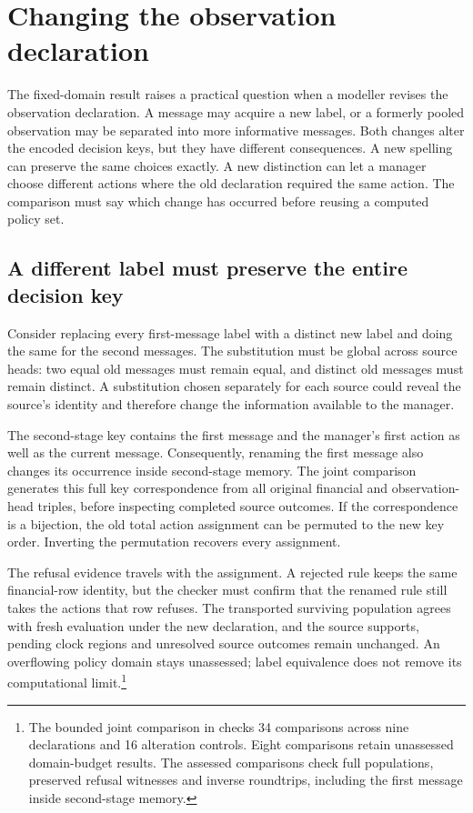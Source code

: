 \section{Changing the observation declaration}
\label{sim:joint-domain-changes}

The fixed-domain result raises a practical question when a modeller revises the observation declaration. A message may acquire a new label, or a formerly pooled observation may be separated into more informative messages. Both changes alter the encoded decision keys, but they have different consequences. A new spelling can preserve the same choices exactly. A new distinction can let a manager choose different actions where the old declaration required the same action. The comparison must say which change has occurred before reusing a computed policy set.

\subsection{A different label must preserve the entire decision key}

Consider replacing every first-message label with a distinct new label and doing the same for the second messages. The substitution must be global across source heads: two equal old messages must remain equal, and distinct old messages must remain distinct. A substitution chosen separately for each source could reveal the source's identity and therefore change the information available to the manager.

The second-stage key contains the first message and the manager's first action as well as the current message. Consequently, renaming the first message also changes its occurrence inside second-stage memory. The joint comparison generates this full key correspondence from all original financial and observation-head triples, before inspecting completed source outcomes. If the correspondence is a bijection, the old total action assignment can be permuted to the new key order. Inverting the permutation recovers every assignment.

The refusal evidence travels with the assignment. A rejected rule keeps the same financial-row identity, but the checker must confirm that the renamed rule still takes the actions that row refuses. The transported surviving population agrees with fresh evaluation under the new declaration, and the source supports, pending clock regions and unresolved source outcomes remain unchanged. An overflowing policy domain stays unassessed; label equivalence does not remove its computational limit.\footnote{The bounded joint comparison in  checks 34 comparisons across nine declarations and 16 alteration controls. Eight comparisons retain unassessed domain-budget results. The assessed comparisons check full populations, preserved refusal witnesses and inverse roundtrips, including the first message inside second-stage memory.}

